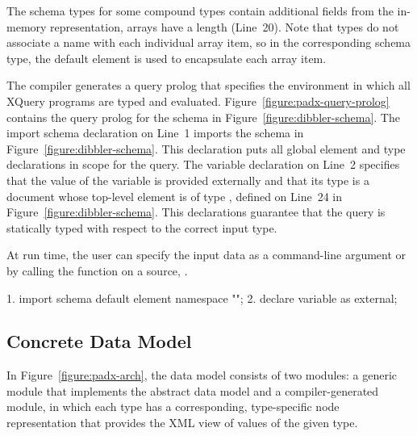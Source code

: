 The schema types for some compound types contain additional fields
from the \pads{} in-memory representation, \eg{} arrays have a length
(Line~20).  Note that  types do not associate a name with
each individual array item, so in the corresponding schema type, the
default element  is used to encapsulate each array item.

The \pads{} compiler generates a query prolog that specifies the
environment in which all XQuery programs are typed and evaluated.
Figure~\ref{figure:padx-query-prolog} contains the query prolog for
the schema in Figure~\ref{figure:dibbler-schema}.  The import schema
declaration on Line~1 imports the schema in
Figure~\ref{figure:dibbler-schema}.  This declaration puts all global
element and type declarations in scope for the query.  The variable
declaration on Line~2 specifies that the value of the variable
 is provided externally and that its type is a document
whose top-level element is of type , defined on Line~24 in
Figure~\ref{figure:dibbler-schema}.  This declarations guarantee
that the query is statically typed with respect to the correct input type.

At run time, the user can specify
the input data as a command-line argument or by calling the
 function on a \pads{} source, \eg{} .
\begin{figure*}
\begin{small}
\begin{code}
 1. import schema default element namespace "";
 2. declare variable  as  external; 
\end{code}
\end{small}
\caption{\padx{} generated query prolog}
\label{figure:padx-query-prolog}
\end{figure*}

\subsection{\padx{} Concrete Data Model}

In Figure~\ref{figure:padx-arch}, the \pads{} data model consists of
two modules: a generic module that implements the \Galax{} abstract
data model and a compiler-generated module, in which each \pads{} type
has a corresponding, type-specific node representation that provides
the XML view of values of the given type.

